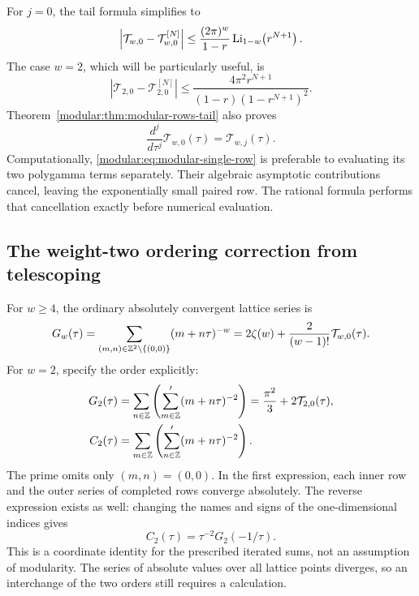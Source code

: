 For \(j=0\), the tail formula simplifies to
\[
\left|\mathcal T_{w,0}-\mathcal T_{w,0}^{[N]}\right|
\le\frac{(2\pi)^w}{1-r}\operatorname{Li}_{1-w}\!\left(r^{N+1}\right).
\]
The case \(w=2\), which will be particularly useful, is
\begin{equation}
\left|\mathcal T_{2,0}-\mathcal T_{2,0}^{[N]}\right|
\le\frac{4\pi^2r^{N+1}}
 {(1-r)(1-r^{N+1})^2}.
\label{modular:eq:modular-weight-two-tail}
\end{equation}
Theorem~\ref{modular:thm:modular-rows-tail} also proves
\begin{equation}
\frac{d^j}{d\tau^j}\mathcal T_{w,0}(\tau)
=\mathcal T_{w,j}(\tau).
\label{modular:eq:modular-termwise-derivatives}
\end{equation}
Computationally, \eqref{modular:eq:modular-single-row} is preferable to
evaluating its two polygamma terms separately. Their algebraic
asymptotic contributions cancel, leaving the exponentially small
paired row. The rational formula performs that cancellation exactly
before numerical evaluation.

\subsection{The weight-two ordering correction from telescoping}

For \(w\ge4\), the ordinary absolutely convergent lattice series is
\[
G_w(\tau)=\sum_{(m,n)\in\mathbb{Z}^2\setminus\{(0,0)\}}
                  (m+n\tau)^{-w}
=2\zeta(w)+\frac{2}{(w-1)!}\mathcal T_{w,0}(\tau).
\]
For \(w=2\), specify the order explicitly:
\begin{align}
G_2(\tau)&=\sum_{n\in\mathbb{Z}}
        \left(\sum_{m\in\mathbb{Z}}'(m+n\tau)^{-2}\right)
 =\frac{\pi^2}{3}+2\mathcal T_{2,0}(\tau),
\label{modular:eq:modular-G2-definition}\\
C_2(\tau)&=\sum_{m\in\mathbb{Z}}
        \left(\sum_{n\in\mathbb{Z}}'(m+n\tau)^{-2}\right).
\label{modular:eq:modular-C2-definition}
\end{align}
The prime omits only \((m,n)=(0,0)\). In the first expression, each
inner row and the outer series of completed rows converge absolutely.
The reverse expression exists as well: changing the names and signs
of the one-dimensional indices gives
\begin{equation}
C_2(\tau)=\tau^{-2}G_2(-1/\tau).
\label{modular:eq:modular-C2-coordinate}
\end{equation}
This is a coordinate identity for the prescribed iterated sums, not
an assumption of modularity. The series of absolute values over all
lattice points diverges, so an interchange of the two orders still
requires a calculation.

